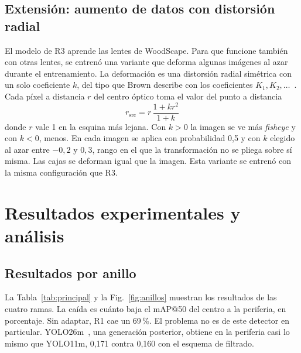 \documentclass[conference]{IEEEtran}
\begin{document}
\subsection{Extensión: aumento de datos con distorsión radial}
El modelo de R3 aprende las lentes de WoodScape. Para que funcione también con otras lentes, se entrenó una variante que deforma algunas imágenes al azar durante el entrenamiento. La deformación es una distorsión radial simétrica con un solo coeficiente $k$, del tipo que Brown describe con los coeficientes $K_1, K_2, \ldots$~\cite{brown1966}. Cada píxel a distancia $r$ del centro óptico toma el valor del punto a distancia
\begin{equation}
r_{\mathrm{src}}=r\,\frac{1+kr^2}{1+k}
\end{equation}
donde $r$ vale 1 en la esquina más lejana. Con $k>0$ la imagen se ve más \textit{fisheye} y con $k<0$, menos. En cada imagen se aplica con probabilidad 0,5 y con $k$ elegido al azar entre $-0{,}2$ y $0{,}3$, rango en el que la transformación no se pliega sobre sí misma. Las cajas se deforman igual que la imagen. Esta variante se entrenó con la misma configuración que R3.

\section{Resultados experimentales y análisis}

\subsection{Resultados por anillo}
La Tabla~\ref{tab:principal} y la Fig.~\ref{fig:anillos} muestran los resultados de las cuatro ramas. La caída es cuánto baja el mAP@50 del centro a la periferia, en porcentaje. Sin adaptar, R1 cae un 69\,\%. El problema no es de este detector en particular. YOLO26m~\cite{jocher2026yolo26}, una generación posterior, obtiene en la periferia casi lo mismo que YOLO11m, 0,171 contra 0,160 con el esquema de filtrado.
\end{document}

